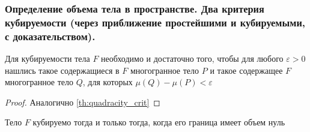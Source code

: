 \documentclass[10pt]{article}
\begin{document}
    \subsubsection{Определение объема тела в пространстве. Два критерия кубируемости (через приближение простейшими и кубируемыми, с доказательством).}
    \begin{definition}
    \end{definition}
    \begin{theorem}
        Для кубируемости тела $F$ необходимо и достаточно того, чтобы для любого $\varepsilon > 0$ нашлись такое содержащиеся в $F$ многогранное тело $P$ и такое содержащее $F$ многогранное тело $Q$, для которых $\mu(Q) - \mu(P) < \varepsilon$
        \label{th:qubic_crit}
    \end{theorem}
    \begin{proof}
        Аналогично \ref{th:quadracity_crit}
    \end{proof}
    \begin{theorem}
        Тело $F$ кубируемо тогда и только тогда, когда его граница имеет объем нуль
    \end{theorem}
\end{document}
